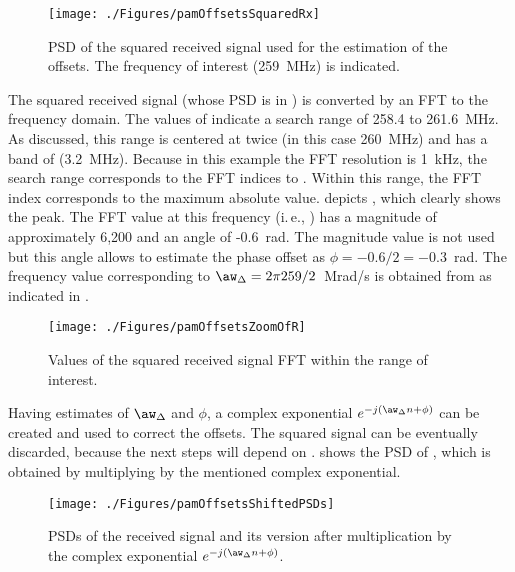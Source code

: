 \begin{figure}[htbp]
\centering
\texttt{[image: ./Figures/pamOffsetsSquaredRx]}
\caption[PSD of the squared received signal  used for the estimation of the offsets]{PSD of the squared received signal  used for the estimation of the offsets. The frequency of interest (259~MHz) is indicated.\label{fig:pamOffsetsSquaredRx}}
\end{figure}

The squared received signal (whose PSD is in ) is converted by an FFT
to the frequency domain.
The values of  indicate a search range of 258.4 to 261.6~MHz.
As discussed, this range is centered at twice  (in this case 260~MHz) and has a band of  (3.2~MHz). Because in this example the FFT resolution is 1~kHz, the search range
 corresponds to the FFT indices  to . Within this range, the FFT index  corresponds to the maximum absolute value.  depicts , which clearly shows
the peak. The FFT value at this frequency (i.\,e., ) has a magnitude of
approximately 6,200 and an angle of -0.6~rad. The magnitude value is not used but this angle allows to estimate the phase offset as $\phi=-0.6/2=-0.3$~rad. The frequency value corresponding
to $\aw_{\Delta} = 2 \pi 259 / 2$~Mrad/s is obtained from  as indicated
in .

\begin{figure}[htbp]
\centering
\texttt{[image: ./Figures/pamOffsetsZoomOfR]}
\caption{Values of the squared received signal FFT within the 
range of interest.\label{fig:pamOffsetsZoomOfR}}
\end{figure}

Having estimates of $\aw_{\Delta}$ and $\phi$, a complex exponential $e^{-j(\aw_{\Delta} n + \phi)}$ can be created and used to correct the offsets. The squared signal can be eventually discarded,
because the next steps will depend on .
 shows the PSD of , which is obtained by multiplying 
by the mentioned complex exponential.

\begin{figure}[htbp]
\centering
\texttt{[image: ./Figures/pamOffsetsShiftedPSDs]}
\caption{PSDs of the received signal  and its version after
multiplication by the complex exponential $e^{-j(\aw_{\Delta} n + \phi)}$.\label{fig:pamOffsetsShiftedPSDs}}
\end{figure}

